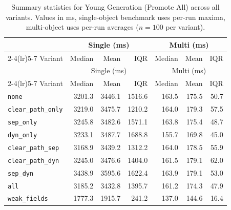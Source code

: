 \begin{longtable}[c]{l rrr rrr}
\caption[Young Generation (Promote All) summary statistics]{Summary statistics for Young Generation (Promote All) across all variants. Values in ms, single-object benchmark uses per-run maxima, multi-object uses per-run averages ($n=100$ per variant).}\label{tab:stats-young_gen} \\
\toprule
 & \multicolumn{3}{c}{Single (ms)} & \multicolumn{3}{c}{Multi (ms)} \\
\cmidrule(lr){2-4}\cmidrule(lr){5-7}
Variant & Median & Mean & IQR & Median & Mean & IQR \\
\midrule
\endfirsthead
\toprule
 & \multicolumn{3}{c}{Single (ms)} & \multicolumn{3}{c}{Multi (ms)} \\
\cmidrule(lr){2-4}\cmidrule(lr){5-7}
Variant & Median & Mean & IQR & Median & Mean & IQR \\
\midrule
\endhead
\bottomrule
\endfoot
\texttt{none} & 3201.3 & 3446.1 & 1516.6 & 163.5 & 175.5 & 50.7 \\
\texttt{clear\_path\_only} & 3219.0 & 3475.7 & 1210.2 & 164.0 & 179.3 & 57.5 \\
\texttt{sep\_only} & 3245.8 & 3482.6 & 1571.1 & 163.8 & 175.4 & 48.7 \\
\texttt{dyn\_only} & 3233.1 & 3487.7 & 1688.8 & 155.7 & 169.8 & 45.0 \\
\texttt{clear\_path\_sep} & 3168.9 & 3439.2 & 1312.2 & 164.0 & 178.5 & 55.9 \\
\texttt{clear\_path\_dyn} & 3245.0 & 3476.6 & 1404.0 & 161.5 & 179.1 & 62.0 \\
\texttt{sep\_dyn} & 3438.9 & 3595.6 & 1622.4 & 163.9 & 179.1 & 53.0 \\
\texttt{all} & 3185.2 & 3432.8 & 1395.7 & 161.2 & 174.3 & 47.9 \\
\texttt{weak\_fields} & 1777.3 & 1915.7 & 241.2 & 137.0 & 144.6 & 16.4 \\
\end{longtable}
